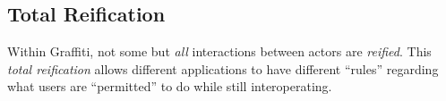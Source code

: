 \subsection{Total Reification}
\label{concepts:total-reification}

Within Graffiti, not some but \emph{all} interactions between actors
are \emph{reified}.
This \emph{total reification} allows different applications to have
different ``rules'' regarding what users are ``permitted'' to do while
still interoperating.




